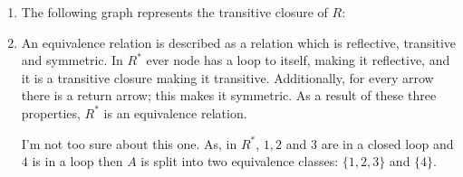 \documentclass{article}
\begin{document}
\begin{enumerate}
\begin{enumerate}
{\begin{itemize}
                                        \end{itemize}
                                }
                                \item{ The following graph represents the transitive closure of $R$:
                                                \begin{figure}[H]
                                                        \centering
                                                \end{figure}
                                }
                                \item An equivalence relation is described as a relation which is reflective, transitive and symmetric. In $R^*$ ever node has a loop to itself, making it reflective, and it is a transitive closure making it transitive. Additionally, for every arrow there is a return arrow; this makes it symmetric. As a result of these three properties, $R^*$ is an equivalence relation.

                                        I'm not too sure about this one. As, in $R^*$, $1,2$ and $3$ are in a closed loop and $4$ is in a loop then $A$ is split into two equivalence classes: $\{1,2,3\}$ and $\{4\}$.

                \end{enumerate}
\end{enumerate}
\end{document}
